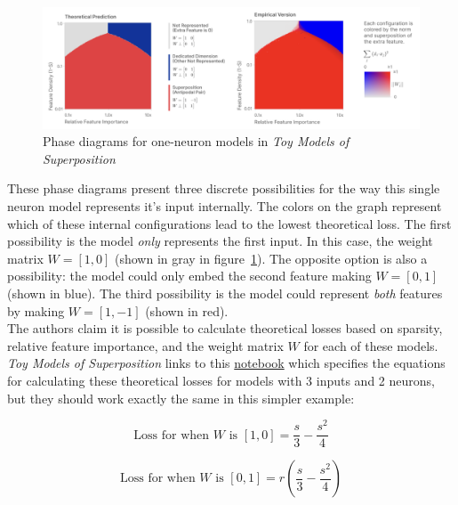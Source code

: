\documentclass{article} %
\begin{document}
\begin{figure}[h]
    \centering
    \includegraphics[width=0.99\linewidth]{phase_changes/images/phase_changes_anthropic.png}
    \captionsetup{font=footnotesize, width=0.75\linewidth} %
    \caption{
        Phase diagrams for one-neuron models in 
        \textit{Toy Models of Superposition}\cite{elhage2022toy}
    }
    \label{fig:section4_anthropic}
\end{figure}

These phase diagrams present three discrete possibilities for the way this single
neuron model represents it's input internally. The colors on the graph represent
which of these internal configurations lead to the lowest theoretical loss.
The first possibility is the model 
\textit{only} represents the first input. In this case, the weight matrix $W = [1, 0]$ (shown in
gray in figure~\ref{fig:section4_anthropic}). The opposite option is also a 
possibility: the model could only embed the second feature making $W = [0, 1]$ 
(shown in blue). The third possibility is the model could represent \textit{both}
features by making $W = [1, -1]$ (shown in red). \\

The authors claim it is possible to calculate theoretical losses based on sparsity,
relative feature importance, and the weight matrix $W$ for each of these models. 
\textit{Toy Models of Superposition} links to this 
\href{https://github.com/wattenberg/superposition/blob/main/Exploring_Exact_Toy_Models.ipynb}{notebook} 
which specifies the equations for calculating these theoretical losses for models 
with 3 inputs and 2 neurons, but they should work exactly the same in this simpler example:

\begin{equation}
    \label{eq:loss1}
    \text{Loss for when  $W$ is $[1, 0]$} = \frac{s}{3} - \frac{s^2}{4}
\end{equation}

\begin{equation}
    \label{eq:loss2}
    \text{Loss for when  $W$ is $[0, 1]$} = r \left(\frac{s}{3} - \frac{s^2}{4}\right)
\end{equation}
\end{document}
